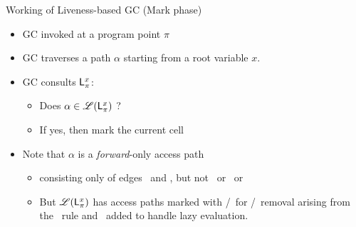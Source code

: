 \documentclass[xcolor=x11names,compress,mathserif]{beamer}
\renewcommand{\(}{\begin{columns}}
\renewcommand{\)}{\end{columns}}
\newcommand{\<}[1]{\begin{column}{#1}}
\renewcommand{\>}{\end{column}}
\begin{document}
\begin{frame}{Working of Liveness-based GC (Mark phase)}
  \begin{itemize}
  \item GC invoked at a program point $\pi$
  \item GC traverses a path $\alpha$ starting from a root variable $x$.
  \item GC consults $\mathsf{L}_{{\pi}}^{x}$: 
    \begin{itemize}
    \item Does $\alpha \in \mathscr{L}(\mathsf{L}_{{\pi}}^{x})$ ?
    \item If yes, then mark the current cell
    \end{itemize}
    \pause
  \item  Note  that  $\alpha$  is a  {\em  forward}-only  access  path
    \begin{itemize}
    \item consisting  only of  edges \acar\  and \acdr,  but not  \bcar\ or
      \bcdr\ or \clazy
    \item But $\mathscr{L}(\mathsf{L}_{{\pi}}^{x})$ has access paths marked with \bcar/\bcdr\ for \acar/\acdr\  removal
  arising from the \CONS\  rule and \clazy\ added to handle lazy evaluation.
    \end{itemize}
  \end{itemize}
\end{frame}
\end{document}
